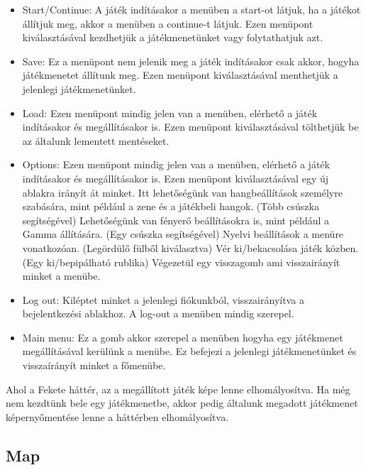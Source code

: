 \begin{itemize}
\item Start/Continue:
A játék indításakor a menüben a start-ot látjuk, ha a játékot állítjuk meg, akkor a menüben a continue-t látjuk.
Ezen menüpont kiválasztásával kezdhetjük a játékmenetünket vagy folytathatjuk azt.

\item Save:
Ez a menüpont nem jelenik meg a játék indításakor csak akkor, hogyha játékmenetet állítunk meg.
Ezen menüpont kiválasztásával menthetjük a jelenlegi játékmenetünket.

\item Load:
Ezen menüpont mindig jelen van a menüben, elérhető a játék indításakor és megállításakor is.
Ezen menüpont kiválasztásával tölthetjük be az általunk lementett mentéseket.

\item Options:
Ezen menüpont mindig jelen van a menüben, elérhető a játék indításakor és megállításakor is.
Ezen menüpont kiválasztásával egy új ablakra irányít át minket.
Itt lehetőségünk van hangbeállítások személyre szabására, mint például a zene és a játékbeli hangok. (Több csúszka segítségével)
Lehetőségünk van fényerő beállításokra is, mint például a Gamma állítására. (Egy csúszka segítségével)
Nyelvi beállítások a menüre vonatkozóan. (Legördülő fülből kiválasztva)
Vér ki/bekacsolása játék közben. (Egy ki/bepipálható rublika)
Végezetül egy visszagomb ami visszairányít minket a menübe.

\item Log out:
Kiléptet minket a jelenlegi fiókunkból, visszairányítva a bejelentkezési ablakhoz.
A log-out a menüben mindig szerepel.

\item Main menu:
Ez a gomb akkor szerepel a menüben hogyha egy játékmenet megállításával kerülünk a menübe.
Ez befejezi a jelenlegi játékmenetünket és visszaírányít minket a főmenübe.
\end{itemize}

Ahol a Fekete háttér, az a megállított játék képe lenne elhomályosítva.
Ha még nem kezdtünk bele egy játékmenetbe, akkor pedig általunk megadott játékmenet képernyőmentése lenne a háttérben elhomályosítva.


\subsection{Map}

